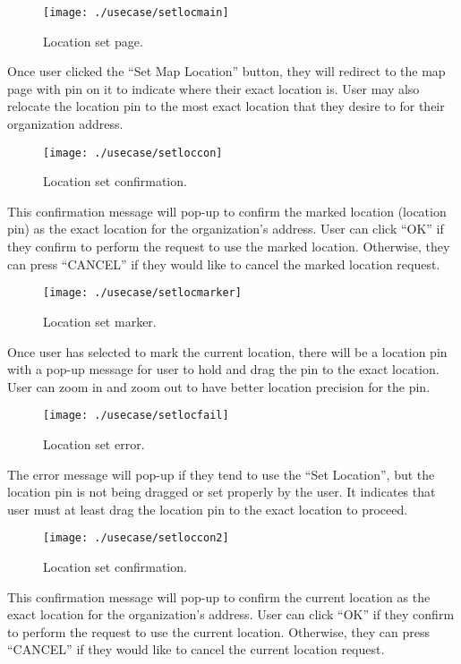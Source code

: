 \documentclass[conference]{IEEEtran}
\begin{document}
\begin{figure}[h!]
\texttt{[image: ./usecase/setlocmain]}
\centering
\caption{Location set page.}
\end{figure}

\par Once user clicked the “Set Map Location” button, they will redirect to the map page with pin on it to indicate where their exact location is. User may also relocate the location pin to the most exact location that they desire to for their organization address. 
\begin{figure}[h!]
\texttt{[image: ./usecase/setloccon]}
\centering
\caption{Location set confirmation.}
\end{figure}

\par This confirmation message will pop-up to confirm the marked location (location pin) as the exact location for the organization’s address. User can click “OK” if they confirm to perform the request to use the marked location. Otherwise, they can press “CANCEL” if they would like to cancel the marked location request. 
\begin{figure}[h!]
\texttt{[image: ./usecase/setlocmarker]}
\centering
\caption{Location set marker.}
\end{figure}
\par Once user has selected to mark the current location, there will be a location pin with a pop-up message for user to hold and drag the pin to the exact location. User can zoom in and zoom out to have better location precision for the pin.
\begin{figure}[h!]
\texttt{[image: ./usecase/setlocfail]}
\centering
\caption{Location set error.}
\end{figure}

The error message will pop-up if they tend to use the “Set Location”, but the location pin is not being dragged or set properly by the user. It indicates that user must at least drag the location pin to the exact location to proceed.
\begin{figure}[h!]
\texttt{[image: ./usecase/setloccon2]}
\centering
\caption{Location set confirmation.}
\end{figure}

This confirmation message will pop-up to confirm the current location as the exact location for the organization’s address. User can click “OK” if they confirm to perform the request to use the current location. Otherwise, they can press “CANCEL” if they would like to cancel the current location request.
\end{document}
